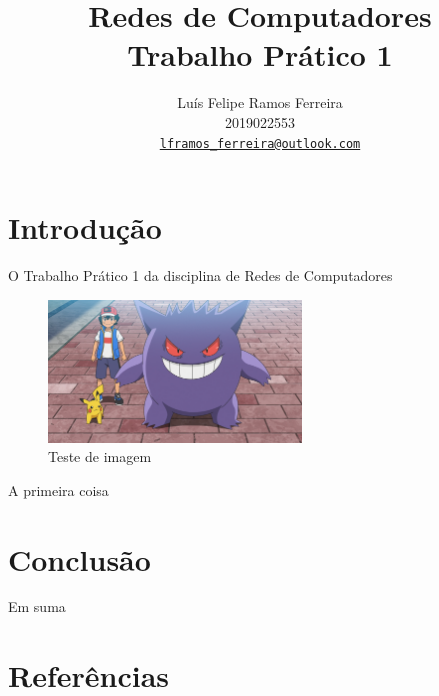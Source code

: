 \documentclass{article}
\title{Redes de Computadores \\ Trabalho Prático 1}
\author{Luís Felipe Ramos Ferreira \\ 2019022553 \\
    \href{mailto:lframos_ferreira@outlook.com}{\texttt{lframos\_ferreira@outlook.com}}}
\begin{document}
\maketitle

\section{Introdução}

O Trabalho Prático 1 da disciplina de Redes de Computadores

\begin{figure}[H]
    \centering
    \includegraphics[width=0.6\textwidth]{images/gengar.png}
    \caption{Teste de imagem}
\end{figure}

A primeira coisa

\section{Conclusão}

Em suma

\section{Referências}
\end{document}
